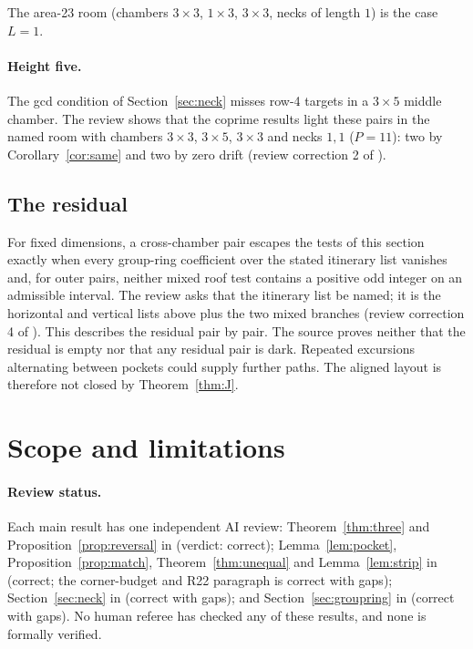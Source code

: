 \documentclass[11pt]{article}
\theoremstyle{definition}
\theoremstyle{remark}
\begin{document}
The area-23 room (chambers $3\times 3$, $1\times 3$, $3\times 3$, necks of length
$1$) is the case $L=1$.

\paragraph{Height five.} The gcd condition of Section~\ref{sec:neck} misses row-4
targets in a $3\times 5$ middle chamber. The review shows that the coprime
results light these pairs in the named room with chambers $3\times 3$,
$3\times 5$, $3\times 3$ and necks $1,1$ ($P=11$): two by
Corollary~\ref{cor:same} and two by zero drift (review correction 2 of
\cite{d203}).

\subsection{The residual}
For fixed dimensions, a cross-chamber pair escapes the tests of this section
exactly when every group-ring coefficient over the stated itinerary list vanishes
and, for outer pairs, neither mixed roof test contains a positive odd integer on
an admissible interval. The review asks that the itinerary list be named; it is
the horizontal and vertical lists above plus the two mixed branches (review
correction 4 of \cite{d203}). This describes the residual pair by pair. The
source proves neither that the residual is empty nor that any residual pair is
dark. Repeated excursions alternating between pockets could supply further
paths. The aligned layout is therefore not closed by Theorem~\ref{thm:J}.

\section{Scope and limitations}\label{sec:scope}
\paragraph{Review status.} Each main result has one independent AI review:
Theorem~\ref{thm:three} and Proposition~\ref{prop:reversal} in \cite{d200}
(verdict: correct); Lemma~\ref{lem:pocket}, Proposition~\ref{prop:match},
Theorem~\ref{thm:unequal} and Lemma~\ref{lem:strip} in \cite{d201} (correct; the
corner-budget and R22 paragraph is correct with gaps); Section~\ref{sec:neck} in
\cite{d202} (correct with gaps); and Section~\ref{sec:groupring} in \cite{d203}
(correct with gaps). No human referee has checked any of these results, and none
is formally verified.
\end{document}
